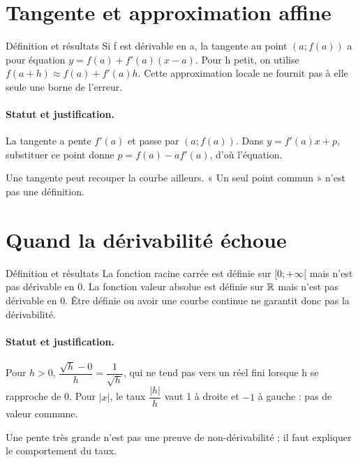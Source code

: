 \section{Tangente et approximation affine}\label{C04-U3}
\begin{repere}{Définition et résultats}
Si f est dérivable en a, la tangente au point $(a;f(a))$ a pour équation $y=f(a)+f\prime(a)(x-a)$. Pour h petit, on utilise $f(a+h)\approx f(a)+f\prime(a)h$. Cette approximation locale ne fournit pas à elle seule une borne de l’erreur.
\end{repere}
\paragraph{Statut et justification.} La tangente a pente $f\prime(a)$ et passe par $(a;f(a))$. Dans $y=f\prime(a)x+p$, substituer ce point donne $p=f(a)-af\prime(a)$, d’où l’équation.
\label{C04-EX3}

\begin{erreur}Une tangente peut recouper la courbe ailleurs. « Un seul point commun » n’est pas une définition.\end{erreur}
\label{C04-AP3}
\section{Quand la dérivabilité échoue}\label{C04-U4}
\begin{repere}{Définition et résultats}
La fonction racine carrée est définie sur $[0;+\infty[$ mais n’est pas dérivable en 0. La fonction valeur absolue est définie sur $\mathbb R$ mais n’est pas dérivable en 0. Être définie ou avoir une courbe continue ne garantit donc pas la dérivabilité.
\end{repere}
\paragraph{Statut et justification.} Pour $h>0$, $\dfrac{\sqrt h-0}{h}=\dfrac{1}{\sqrt h}$, qui ne tend pas vers un réel fini lorsque h se rapproche de 0. Pour $|x|$, le taux $\dfrac{|h|}{h}$ vaut 1 à droite et $-1$ à gauche : pas de valeur commune.
\label{C04-EX4}
\begin{erreur}Une pente très grande n’est pas une preuve de non-dérivabilité ; il faut expliquer le comportement du taux.\end{erreur}
\label{C04-AP4}
